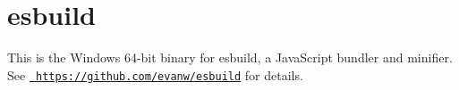 \chapter{esbuild}
\hypertarget{md__project5___h_r_2_project5___h_r___front___end_2node__modules_2_0desbuild_2win32-x64_2_r_e_a_d_m_e}{}\label{md__project5___h_r_2_project5___h_r___front___end_2node__modules_2_0desbuild_2win32-x64_2_r_e_a_d_m_e}
\label{md__project5___h_r_2_project5___h_r___front___end_2node__modules_2_0desbuild_2win32-x64_2_r_e_a_d_m_e_autotoc_md146}%
%
 This is the Windows 64-\/bit binary for esbuild, a Java\+Script bundler and minifier. See \href{https://github.com/evanw/esbuild}{\texttt{ https\+://github.\+com/evanw/esbuild}} for details. 